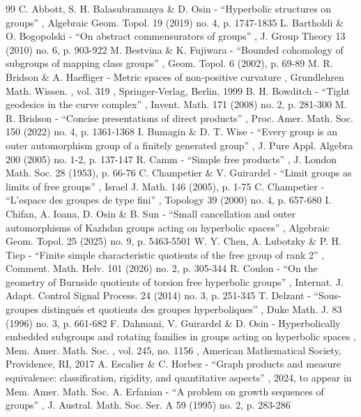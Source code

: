 \documentclass[11pt]{article}
\theoremstyle{definition}
\begin{document}
\begin{thebibliography}{99}
 C. Abbott, S. H. Balasubramanya \& D. Osin - “Hyperbolic structures on groups” , Algebraic Geom. Topol. 19 (2019) no. 4, p. 1747-1835
 L. Bartholdi \& O. Bogopolski - “On abstract commensurators of groups” , J. Group Theory 13 (2010) no. 6, p. 903-922
 M. Bestvina \& K. Fujiwara - “Bounded cohomology of subgroups of mapping class groups” , Geom. Topol. 6 (2002), p. 69-89
 M. R. Bridson \& A. Haefliger - Metric spaces of non-positive curvature , Grundlehren Math. Wissen. , vol. 319 , Springer-Verlag, Berlin, 1999
 B. H. Bowditch - “Tight geodesics in the curve complex” , Invent. Math. 171 (2008) no. 2, p. 281-300
 M. R. Bridson - “Concise presentations of direct products” , Proc. Amer. Math. Soc. 150 (2022) no. 4, p. 1361-1368
 I. Bumagin \& D. T. Wise - “Every group is an outer automorphism group of a finitely generated group” , J. Pure Appl. Algebra 200 (2005) no. 1-2, p. 137-147
 R. Camm - “Simple free products” , J. London Math. Soc. 28 (1953), p. 66-76
 C. Champetier \& V. Guirardel - “Limit groups as limits of free groups” , Israel J. Math. 146 (2005), p. 1-75
 C. Champetier - “L’espace des groupes de type fini” , Topology 39 (2000) no. 4, p. 657-680
 I. Chifan, A. Ioana, D. Osin \& B. Sun - “Small cancellation and outer automorphisms of Kazhdan groups acting on hyperbolic spaces” , Algebraic Geom. Topol. 25 (2025) no. 9, p. 5463-5501
 W. Y. Chen, A. Lubotzky \& P. H. Tiep - “Finite simple characteristic quotients of the free group of rank 2” , Comment. Math. Helv. 101 (2026) no. 2, p. 305-344
 R. Coulon - “On the geometry of Burnside quotients of torsion free hyperbolic groups” , Internat. J. Adapt. Control Signal Process. 24 (2014) no. 3, p. 251-345
 T. Delzant - “Sous-groupes distingués et quotients des groupes hyperboliques” , Duke Math. J. 83 (1996) no. 3, p. 661-682
 F. Dahmani, V. Guirardel \& D. Osin - Hyperbolically embedded subgroups and rotating families in groups acting on hyperbolic spaces , Mem. Amer. Math. Soc. , vol. 245, no. 1156 , American Mathematical Society, Providence, RI, 2017
 A. Escalier \& C. Horbez - “Graph products and measure equivalence: classification, rigidity, and quantitative aspects” , 2024, to appear in Mem. Amer. Math. Soc.
 A. Erfanian - “A problem on growth sequences of groups” , J. Austral. Math. Soc. Ser. A 59 (1995) no. 2, p. 283-286

\end{thebibliography}
\end{document}
